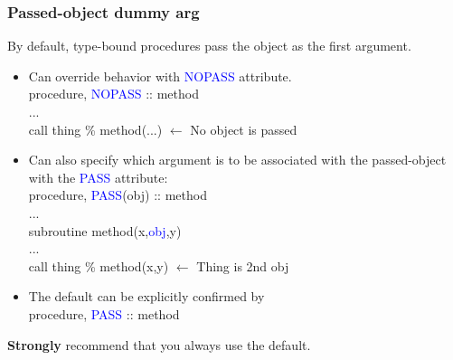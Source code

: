 \documentclass[11pt]{beamer}
\begin{document}

\begin{frame}[fragile]
\frametitle{Passed-object dummy arg}

\scriptsize{
By default, type-bound procedures pass the object as the first argument.
\begin{itemize}
  \item Can override behavior with \textcolor{blue}{NOPASS} attribute.\\
  \quad procedure, \textcolor{blue}{NOPASS} :: method\\
  \quad ...\\
  \quad call thing \% method(...)  $\leftarrow$ No object is passed \\
  
  \item Can also specify which argument is to be associated with the passed-object with the \textcolor{blue}{PASS} attribute:\\
  \quad procedure, \textcolor{blue}{PASS}(obj) :: method\\
  \quad ...\\
  \quad subroutine method(x,\textcolor{blue}{obj},y) \\
  \quad ... \\
  \quad call thing \% method(x,y)  $\leftarrow$ Thing is 2nd obj \\
  \item The default can be explicitly confirmed by \\
  \quad procedure, \textcolor{blue}{PASS} :: method\\
\end{itemize}
\textbf{Strongly} recommend that you always use the default.
}

\end{frame}

\end{document}

